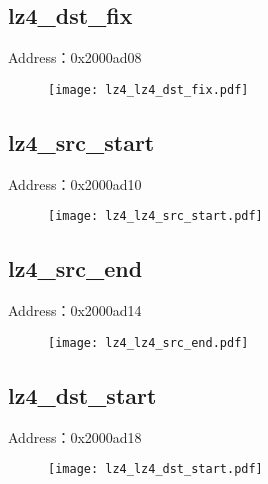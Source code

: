 \subsection{lz4\_dst\_fix}
\label{lz4-lz4-dst-fix}
Address：0x2000ad08
 \begin{figure}[H]
\texttt{[image: lz4\_lz4\_dst\_fix.pdf]}
\end{figure}

\subsection{lz4\_src\_start}
\label{lz4-lz4-src-start}
Address：0x2000ad10
 \begin{figure}[H]
\texttt{[image: lz4\_lz4\_src\_start.pdf]}
\end{figure}

\subsection{lz4\_src\_end}
\label{lz4-lz4-src-end}
Address：0x2000ad14
 \begin{figure}[H]
\texttt{[image: lz4\_lz4\_src\_end.pdf]}
\end{figure}

\subsection{lz4\_dst\_start}
\label{lz4-lz4-dst-start}
Address：0x2000ad18
 \begin{figure}[H]
\texttt{[image: lz4\_lz4\_dst\_start.pdf]}
\end{figure}

